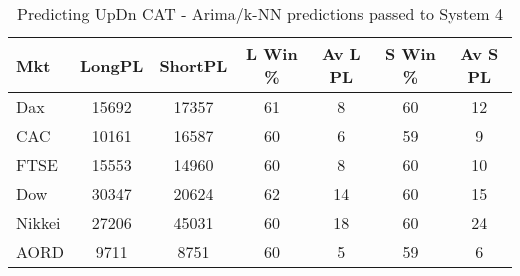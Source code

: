 \begin{table}[ht]
\centering
\caption[Predicting UpDn CAT - Arima/k-NN predictions passed to System 4.]{Predicting UpDn CAT - Arima/k-NN predictions passed to System 4} 
\label{tab:chp_ts:pUD_CAT_arima_knn_sys}
\begin{tabular}{lcccccc}
  \toprule Mkt & LongPL & ShortPL & L Win \% & Av L PL & S Win \% & Av S PL \\ 
  \midrule Dax & 15692 & 17357 & 61 & 8 & 60 & 12 \\ 
  CAC & 10161 & 16587 & 60 & 6 & 59 & 9 \\ 
  FTSE & 15553 & 14960 & 60 & 8 & 60 & 10 \\ 
  Dow & 30347 & 20624 & 62 & 14 & 60 & 15 \\ 
  Nikkei & 27206 & 45031 & 60 & 18 & 60 & 24 \\ 
  AORD & 9711 & 8751 & 60 & 5 & 59 & 6 \\ 
   \bottomrule \end{tabular}
\end{table}
